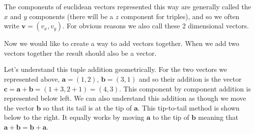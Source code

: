 \noindent The components of euclidean vectors represented this way are generally called the $x$ and $y$ components (there will be a $z$ component for triples), and so we often write $\mathbf{v}=(v_x, v_y)$. For obvious reasons we also call these 2 dimensional vectors.

Now we would like to create a way to add vectors together. When we add two vectors together the result should also be a vector. 


\noindent Let's understand this tuple addition geometrically. For the two vectors we represented above, $\mathbf{a}=(1,2)$, $\mathbf{b}=(3,1)$ and so their addition is the vector $\mathbf{c}=\mathbf{a}+\mathbf{b}=(1+3,2+1)=(4,3)$. This component by component addition is represented below left. We can also understand this addition as though we move the vector $\mathbf{b}$ so that its tail is at the tip of $\mathbf{a}$. This tip-to-tail method is shown below to the right. It equally works by moving $\mathbf{a}$ to the tip of $\mathbf{b}$ meaning that $\mathbf{a}+\mathbf{b} = \mathbf{b}+\mathbf{a}$.


